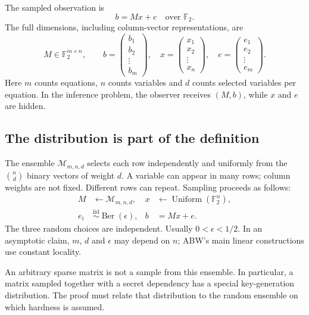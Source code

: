 \documentclass[11pt,a4paper]{article}
\newcommand{\F}{\mathbb F}
\newcommand{\Ber}{\operatorname{Ber}}
\newcommand{\cM}{\mathcal M}
\begin{document}
The sampled observation is
\begin{equation}\boxed{b=Mx+e\quad\text{over }\F_2.}\label{eq:model}\end{equation}
The full dimensions, including column-vector representations, are
\begin{equation}
 M\in\F_2^{m\times n},\qquad
 b=\begin{pmatrix}b_1\\b_2\\\vdots\\b_m\end{pmatrix},\quad
 x=\begin{pmatrix}x_1\\x_2\\\vdots\\x_n\end{pmatrix},\quad
 e=\begin{pmatrix}e_1\\e_2\\\vdots\\e_m\end{pmatrix}.
\end{equation}
Here $m$ counts equations, $n$ counts variables and $d$ counts selected variables per equation. In the inference problem, the observer receives $(M,b)$, while $x$ and $e$ are hidden.

\subsection{The distribution is part of the definition}
The ensemble $\cM_{m,n,d}$ selects each row independently and uniformly from the $\binom nd$ binary vectors of weight $d$. A variable can appear in many rows; column weights are not fixed. Different rows can repeat. Sampling proceeds as follows:
\begin{align}
 M&\leftarrow\cM_{m,n,d}, &x&\leftarrow\operatorname{Uniform}(\F_2^n),\\
 e_i&\overset{\mathrm{iid}}\sim\Ber(\epsilon),&b&=Mx+e.
\end{align}
The three random choices are independent. Usually $0<\epsilon<1/2$. In an asymptotic claim, $m$, $d$ and $\epsilon$ may depend on $n$; ABW's main linear constructions use constant locality.

An arbitrary sparse matrix is not a sample from this ensemble. In particular, a matrix sampled together with a secret dependency has a special key-generation distribution. The proof must relate that distribution to the random ensemble on which hardness is assumed.
\end{document}
